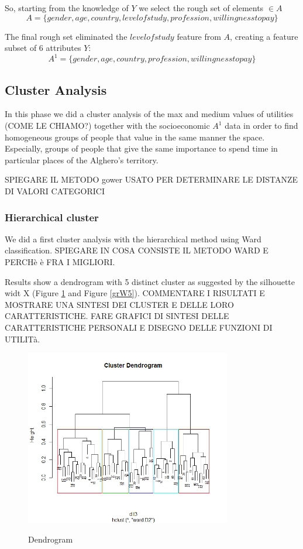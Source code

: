 \documentclass[a4paper]{article}
\begin{document}
So, starting from the knowledge of $Y$ we select the rough set of elements $\in A$
\begin{equation}
A=\{gender,age,country,level of study,profession,willingness to pay\}
\end{equation}

The final rough set eliminated the $level of study$ feature from $A$, creating a feature subset of 6 attributes $Y$:
\begin{equation}
A^1=\{gender,age, country,profession,willingness to pay\}
\end{equation}

\subsection{Cluster Analysis}
In this phase we did a cluster analysis of the max and medium values of utilities (COME LE CHIAMO?) together with the socioeconomic $A^1$ data in order to find homogeneous groups of people that value in the same manner the space. Especially, groups of people that give the same importance to spend time in particular places of the Alghero's territory.

SPIEGARE IL METODO gower USATO PER DETERMINARE LE DISTANZE DI VALORI CATEGORICI


\subsubsection{Hierarchical cluster}

We did a first cluster analysis with the hierarchical method using Ward classification.
SPIEGARE IN COSA CONSISTE IL METODO WARD E PERCHè è FRA I MIGLIORI.

Results show a dendrogram with 5 distinct cluster as suggested by the silhouette widt X (Figure \ref{hcW} and Figure \ref{grW5}).
COMMENTARE I RISULTATI E MOSTRARE UNA SINTESI DEI CLUSTER E DELLE LORO CARATTERISTICHE. FARE GRAFICI DI SINTESI DELLE CARATTERISTICHE PERSONALI E DISEGNO DELLE FUNZIONI DI UTILITà.

\begin{figure}[h]
  \centering
    \includegraphics[width=9cm]{hc_Ward_5}\\
  \caption{Dendrogram}\label{hcW}
\end{figure}
\end{document}
